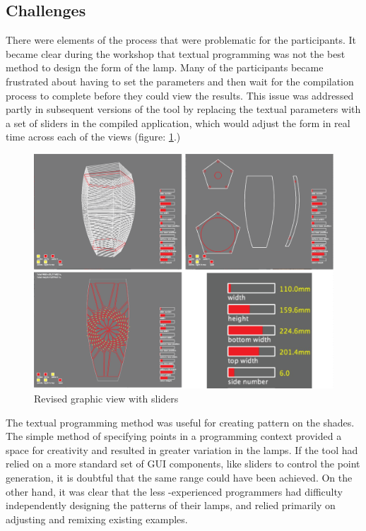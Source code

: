 \subsection{Challenges}
There were elements of the process that were problematic for the participants. It became clear during the workshop that textual programming was not the best method to design the form of the lamp. Many of the participants became frustrated about having to set the parameters and then wait for the compilation process to complete before they could view the results. This issue was addressed partly in subsequent versions of the tool by replacing the textual parameters with a set of sliders in the compiled application, which would adjust the form in real time across each of the views (figure: \ref{fig:slider_interface}.)
\begin{center}
\begin{figure}[h!]
\includegraphics[width=\columnwidth]{images/slider_interface.png}
\caption{Revised graphic view with sliders}
\label{fig:slider_interface}
\end{figure}
\end{center}

The textual programming method was useful for creating pattern on the shades. The simple method of specifying points in a programming context provided a space for creativity and resulted in greater variation in the lamps. If the tool had relied on a more standard set of GUI components, like sliders to control the point generation, it is doubtful that the same range could have been achieved. On the other hand, it was clear that the less -experienced programmers had difficulty independently designing the patterns of their lamps, and relied primarily on adjusting and remixing existing examples. 

